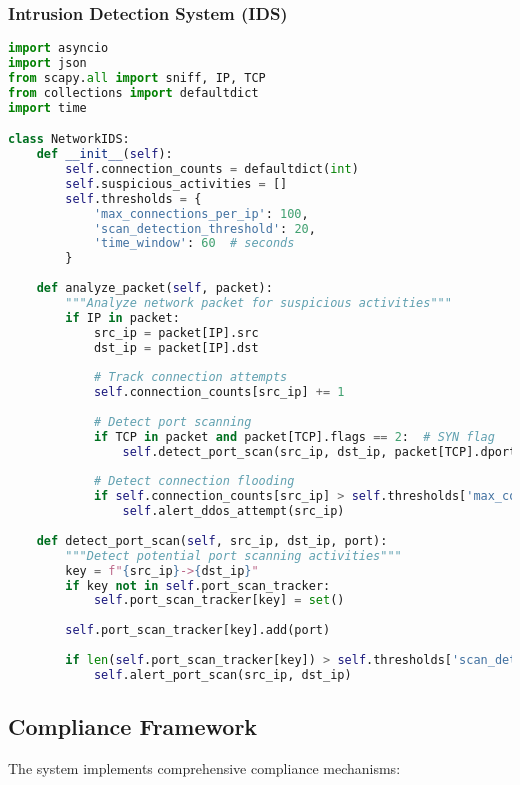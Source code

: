 \subsubsection{Intrusion Detection System (IDS)}
\begin{lstlisting}[language=python, caption=Network IDS Implementation]
import asyncio
import json
from scapy.all import sniff, IP, TCP
from collections import defaultdict
import time

class NetworkIDS:
    def __init__(self):
        self.connection_counts = defaultdict(int)
        self.suspicious_activities = []
        self.thresholds = {
            'max_connections_per_ip': 100,
            'scan_detection_threshold': 20,
            'time_window': 60  # seconds
        }
        
    def analyze_packet(self, packet):
        """Analyze network packet for suspicious activities"""
        if IP in packet:
            src_ip = packet[IP].src
            dst_ip = packet[IP].dst
            
            # Track connection attempts
            self.connection_counts[src_ip] += 1
            
            # Detect port scanning
            if TCP in packet and packet[TCP].flags == 2:  # SYN flag
                self.detect_port_scan(src_ip, dst_ip, packet[TCP].dport)
                
            # Detect connection flooding
            if self.connection_counts[src_ip] > self.thresholds['max_connections_per_ip']:
                self.alert_ddos_attempt(src_ip)
                
    def detect_port_scan(self, src_ip, dst_ip, port):
        """Detect potential port scanning activities"""
        key = f"{src_ip}->{dst_ip}"
        if key not in self.port_scan_tracker:
            self.port_scan_tracker[key] = set()
            
        self.port_scan_tracker[key].add(port)
        
        if len(self.port_scan_tracker[key]) > self.thresholds['scan_detection_threshold']:
            self.alert_port_scan(src_ip, dst_ip)
\end{lstlisting}

\subsection{Compliance Framework}

The system implements comprehensive compliance mechanisms:


